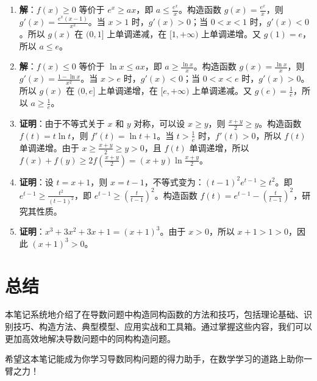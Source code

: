 \documentclass[a4paper,11pt]{ctexrep}
\theoremstyle{definition}
\begin{document}
\begin{enumerate}
    \item \textbf{解}：$f(x) \geq 0$ 等价于 $e^x \geq ax$，即 $a \leq \frac{e^x}{x}$。构造函数 $g(x) = \frac{e^x}{x}$，则 $g'(x) = \frac{e^x(x-1)}{x^2}$。当 $x > 1$ 时，$g'(x) > 0$；当 $0 < x < 1$ 时，$g'(x) < 0$。所以 $g(x)$ 在 $(0, 1]$ 上单调递减，在 $[1, +\infty)$ 上单调递增。又 $g(1) = e$，所以 $a \leq e$。
    
    \item \textbf{解}：$f(x) \leq 0$ 等价于 $\ln x \leq ax$，即 $a \geq \frac{\ln x}{x}$。构造函数 $g(x) = \frac{\ln x}{x}$，则 $g'(x) = \frac{1 - \ln x}{x^2}$。当 $x > e$ 时，$g'(x) < 0$；当 $0 < x < e$ 时，$g'(x) > 0$。所以 $g(x)$ 在 $(0, e]$ 上单调递增，在 $[e, +\infty)$ 上单调递减。又 $g(e) = \frac{1}{e}$，所以 $a \geq \frac{1}{e}$。
    
    \item \textbf{证明}：由于不等式关于 $x$ 和 $y$ 对称，可以设 $x \geq y$，则 $\frac{x+y}{2} \geq y$。构造函数 $f(t) = t\ln t$，则 $f'(t) = \ln t + 1$。当 $t > \frac{1}{e}$ 时，$f'(t) > 0$，所以 $f(t)$ 单调递增。由于 $x \geq \frac{x+y}{2} \geq y > 0$，且 $f(t)$ 单调递增，所以 $f(x) + f(y) \geq 2f(\frac{x+y}{2}) = (x+y)\ln\frac{x+y}{2}$。
    
    \item \textbf{证明}：设 $t = x + 1$，则 $x = t - 1$，不等式变为：$(t-1)^2e^{t-1} \geq t^2$。即 $e^{t-1} \geq \frac{t^2}{(t-1)^2}$，即 $e^{t-1} \geq (\frac{t}{t-1})^2$。构造函数 $f(t) = e^{t-1} - (\frac{t}{t-1})^2$，研究其性质。
    
    \item \textbf{证明}：$x^3 + 3x^2 + 3x + 1 = (x+1)^3$。由于 $x > 0$，所以 $x+1 > 1 > 0$，因此 $(x+1)^3 > 0$。
\end{enumerate}

\section{总结}

本笔记系统地介绍了在导数问题中构造同构函数的方法和技巧，包括理论基础、识别技巧、构造方法、典型模型、应用实战和工具箱。通过掌握这些内容，我们可以更加高效地解决导数问题中的同构构造问题。

希望这本笔记能成为你学习导数同构问题的得力助手，在数学学习的道路上助你一臂之力！
\end{document}
